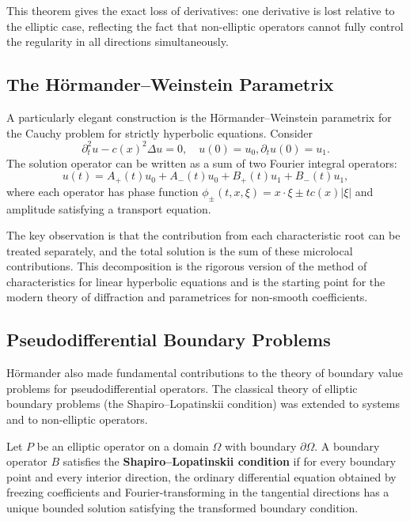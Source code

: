 This theorem gives the exact loss of derivatives: one derivative is
lost relative to the elliptic case, reflecting the fact that
non-elliptic operators cannot fully control the regularity in all
directions simultaneously.

\subsection{The H\"ormander--Weinstein Parametrix}

A particularly elegant construction is the
H\"ormander--Weinstein parametrix for the Cauchy problem for strictly
hyperbolic equations. Consider
\[
\partial_t^2 u - c(x)^2 \Delta u = 0, \quad u(0) = u_0,
\partial_t u(0) = u_1.
\]
The solution operator can be written as a sum of two Fourier integral
operators:
\[
u(t) = A_+(t) u_0 + A_-(t) u_0 + B_+(t) u_1 + B_-(t) u_1,
\]
where each operator has phase function \(\phi_\pm(t,x,\xi) = x\cdot\xi
\pm t c(x)|\xi|\) and amplitude satisfying a transport equation.

The key observation is that the contribution from each characteristic
root can be treated separately, and the total solution is the sum of
these microlocal contributions. This decomposition is the rigorous
version of the method of characteristics for linear hyperbolic
equations and is the starting point for the modern theory of
diffraction and parametrices for non-smooth coefficients.

\subsection{Pseudodifferential Boundary Problems}

H\"ormander also made fundamental contributions to the theory of
boundary value problems for pseudodifferential operators. The
classical theory of elliptic boundary problems (the
Shapiro--Lopatinskii condition) was extended to systems and to
non-elliptic operators.

\begin{definition}
Let \(P\) be an elliptic operator on a domain \(\Omega\) with boundary
\(\partial\Omega\). A boundary operator \(B\) satisfies the
\textbf{Shapiro--Lopatinskii condition} if for every boundary point
and every interior direction, the ordinary differential equation
obtained by freezing coefficients and Fourier-transforming in the
tangential directions has a unique bounded solution satisfying the
transformed boundary condition.
\end{definition}

